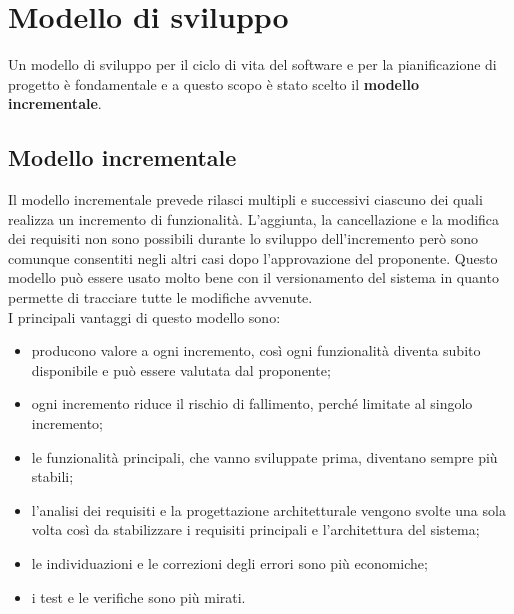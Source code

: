 \section{Modello di sviluppo}
Un modello di sviluppo per il ciclo di vita del software e per la pianificazione di progetto è fondamentale e a questo scopo è stato scelto il \textbf{modello incrementale}.

\subsection{Modello incrementale}
Il modello incrementale prevede rilasci multipli e successivi ciascuno dei quali realizza un incremento di funzionalità.
L'aggiunta, la cancellazione e la modifica dei requisiti non sono possibili durante lo sviluppo dell'incremento però sono comunque consentiti negli altri casi dopo l'approvazione del proponente.
Questo modello può essere usato molto bene con il versionamento del sistema in quanto permette di tracciare tutte le modifiche avvenute.\\
I principali vantaggi di questo modello sono:
\begin{itemize}
	\item producono valore a ogni incremento, così ogni funzionalità diventa subito disponibile e può essere valutata dal proponente;\\
	\item ogni incremento riduce il rischio di fallimento, perché limitate al singolo incremento;\\
	\item le funzionalità principali, che vanno sviluppate prima, diventano sempre più stabili;\\
	\item l'analisi dei requisiti e la progettazione architetturale vengono svolte una sola volta così da stabilizzare i requisiti principali e l'architettura del sistema;\\
	\item le individuazioni e le correzioni degli errori sono più economiche; \\
	\item i test e le verifiche sono più mirati. \\
\end{itemize}

